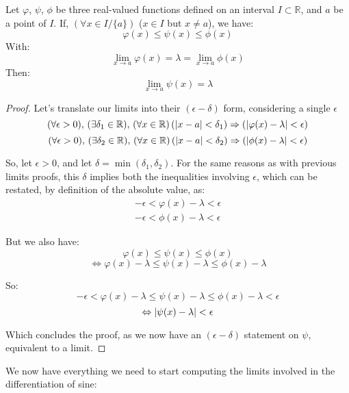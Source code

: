 \documentclass[solutions.tex]{subfiles}
\begin{document}
\begin{theorem} Let $\varphi$, $\psi$, $\phi$ be three
real-valued functions defined on an interval $I\subset\mathbb{R}$, and
$a$ be a point of $I$. If, $(\forall x \in I/\{a\})$ ($x\in I$ but $x\neq a$),
we have:
\[
	\varphi(x) \le \psi(x) \le \phi(x)
\]
With:
\[
	\lim_{x\rightarrow a} \varphi(x) = \lambda = \lim_{x\rightarrow a}\phi(x)
\]
Then:
\[
	\boxed{\lim_{x\rightarrow a}\psi(x) = \lambda}
\]
\end{theorem}
\begin{proof}
Let's translate our limits into their $(\epsilon-\delta)$ form,
considering a single $\epsilon$
\[ \epsdelta{\epsilon}{\delta_1}{a}{x}{\varphi(x)}{\lambda}  \]
\[ \epsdelta{\epsilon}{\delta_2}{a}{x}{\phi(x)}{\lambda}     \]

So, let $\epsilon >0$, and let $\delta=\min(\delta_1,\delta_2)$. For
the same reasons as with previous limits proofs, this $\delta$ implies
both the inequalities involving $\epsilon$, which can be restated, by
definition of the absolute value, as:
\begin{equation*} \begin{aligned}
	-\epsilon < \varphi(x)-\lambda < \epsilon \\
	-\epsilon < \phi(x)-\lambda < \epsilon
\end{aligned} \end{equation*}

But we also have:
\[ \varphi(x) \le \psi(x) \le \phi(x) \]
\[ \Leftrightarrow \varphi(x)-\lambda \le \psi(x)-\lambda \le \phi(x)-\lambda \]

So:
\[ -\epsilon < \varphi(x)-\lambda \le \psi(x)-\lambda \le \phi(x)-\lambda < \epsilon \]
\[ \Leftrightarrow \abs{\psi(x)-\lambda} < \epsilon \]

Which concludes the proof, as we now have an $(\epsilon-\delta)$ statement
on $\psi$, equivalent to a limit.

\end{proof}

\hrr

We now have everything we need to start computing the limits involved
in the differentiation of sine:
\end{document}
